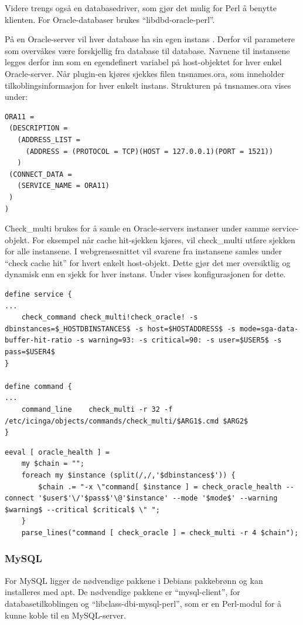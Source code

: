 Videre trengs også en databasedriver, som gjør det mulig for Perl å benytte klienten. For Oracle-databaser brukes ``libdbd-oracle-perl''.

På en Oracle-server vil hver database ha sin egen instans \cite{oraclefaq}. Derfor vil parametere som overvåkes være forskjellig fra database til database. Navnene til instansene legges derfor inn som en egendefinert variabel på host-objektet for hver enkel Oracle-server. Når plugin-en kjøres sjekkes filen tnsnames.ora, som inneholder tilkoblingsinformasjon for hver enkelt instans. Strukturen på tnsnames.ora vises under:

\begin{lstlisting}[style=example]
ORA11 =
 (DESCRIPTION = 
   (ADDRESS_LIST =
     (ADDRESS = (PROTOCOL = TCP)(HOST = 127.0.0.1)(PORT = 1521))
   )
 (CONNECT_DATA =
   (SERVICE_NAME = ORA11)
 )
)
\end{lstlisting}

Check\_multi brukes for å samle en Oracle-servers instanser under samme service-objekt. For eksempel når cache hit-sjekken kjøres, vil check\_multi utføre sjekken for alle instansene. I webgrensesnittet vil svarene fra instansene samles under ``check cache hit'' for hvert enkelt host-objekt. Dette gjør det mer oversiktlig og dynamisk enn en sjekk for hver instans. Under vises konfigurasjonen for dette.

\begin{lstlisting}[style=example]
define service {
...
    check_command check_multi!check_oracle! -s dbinstances=$_HOSTDBINSTANCES$ -s host=$HOSTADDRESS$ -s mode=sga-data-buffer-hit-ratio -s warning=93: -s critical=90: -s user=$USER5$ -s pass=$USER4$
}

define command {
...
	command_line	check_multi -r 32 -f /etc/icinga/objects/commands/check_multi/$ARG1$.cmd $ARG2$
}
\end{lstlisting}
\begin{lstlisting}[style=example]
eeval [ oracle_health ] =
    my $chain = "";
    foreach my $instance (split(/,/,'$dbinstances$')) {
        $chain .= "-x \"command[ $instance ] = check_oracle_health --connect '$user$'\/'$pass$'\@'$instance' --mode '$mode$' --warning $warning$ --critical $critical$ \" ";
    }
    parse_lines("command [ check_oracle ] = check_multi -r 4 $chain");
\end{lstlisting}

\subsubsection{MySQL}
For MySQL ligger de nødvendige pakkene i Debians pakkebrønn og kan installeres med apt. De nødvendige pakkene er ``mysql-client'', for databasetilkoblingen og ``libclass-dbi-mysql-perl'', som er en Perl-modul for å kunne koble til en MySQL-server.

